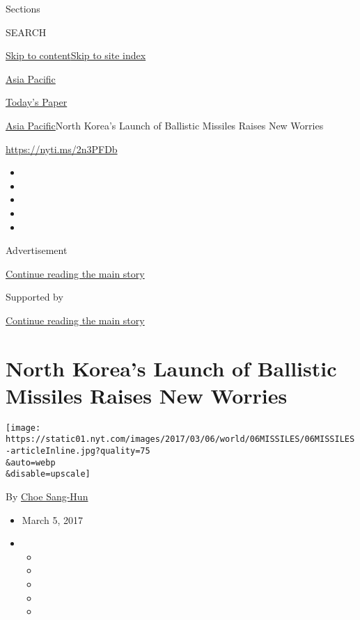 Sections

SEARCH

\protect\hyperlink{site-content}{Skip to
content}\protect\hyperlink{site-index}{Skip to site index}

\href{https://www.nytimes.com/section/world/asia}{Asia Pacific}

\href{https://myaccount.nytimes.com/auth/login?response_type=cookie\&client_id=vi}{}

\href{https://www.nytimes.com/section/todayspaper}{Today's Paper}

\href{/section/world/asia}{Asia Pacific}\textbar{}North Korea's Launch
of Ballistic Missiles Raises New Worries

\url{https://nyti.ms/2n3PFDb}

\begin{itemize}
\item
\item
\item
\item
\item
\end{itemize}

Advertisement

\protect\hyperlink{after-top}{Continue reading the main story}

Supported by

\protect\hyperlink{after-sponsor}{Continue reading the main story}

\hypertarget{north-koreas-launch-of-ballistic-missiles-raises-new-worries}{%
\section{North Korea's Launch of Ballistic Missiles Raises New
Worries}\label{north-koreas-launch-of-ballistic-missiles-raises-new-worries}}

\texttt{[image: https://static01.nyt.com/images/2017/03/06/world/06MISSILES/06MISSILES-articleInline.jpg?quality=75\\\&auto=webp\\\&disable=upscale]}

By \href{http://www.nytimes.com/by/choe-sang-hun}{Choe Sang-Hun}

\begin{itemize}
\item
  March 5, 2017
\item
  \begin{itemize}
  \item
  \item
  \item
  \item
  \item
  \end{itemize}
\end{itemize}

